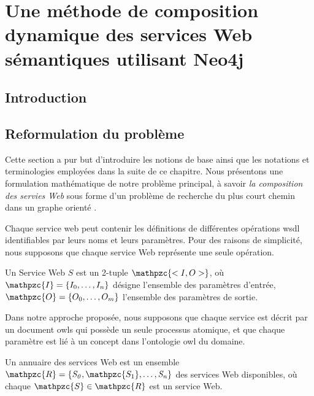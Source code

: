 \chapter{Une méthode de composition dynamique des services Web
  sémantiques utilisant Neo4j}
\label{ch:approach}

\section*{Introduction}
 

\newpage
\section{Reformulation du problème}
\label{sec:reformulation}
Cette section a pur but d'introduire les notions de base ainsi que les
notations et terminologies employées dans la suite de ce
chapitre. Nous présentons une formulation mathématique de notre
problème principal, à savoir \textit{la composition des servies Web}
sous forme d'un problème de recherche du plus court chemin dans un
graphe orienté .\bigskip

Chaque service web peut contenir les définitions de différentes
opérations \acrshort{wsdl} identifiables par leurs noms et leurs
paramètres. Pour des raisons de simplicité, nous supposons que chaque
service Web représente une seule opération.\medskip

\begin{mydef}
  Un Service Web $S$ est un 2-tuple $\mathpzc{<I,O>}$, où
  $\mathpzc{I}=\{I_0, \dots, I_n\}$ désigne l'ensemble des paramètres
  d'entrée, $\mathpzc{O}=\{O_0, \dots, O_m\}$ l'ensemble des
  paramètres de sortie.
\end{mydef}



Dans notre approche proposée, nous supposons que chaque service est
décrit par un document \acrshort{owls} qui possède un seule processus
atomique, et que chaque paramètre est lié à un concept dans
l'ontologie \acrshort{owl} du domaine.\medskip

\begin{mydef}
  Un annuaire des services Web est un ensemble
  $\mathpzc{R} =\{\mathit{S_0}, \mathpzc{S_1}, \dots,\mathit{S_n}\}$
  des services Web disponibles, où chaque
  $\mathpzc{S} \in \mathpzc{R}$ est un service Web.
\end{mydef}

